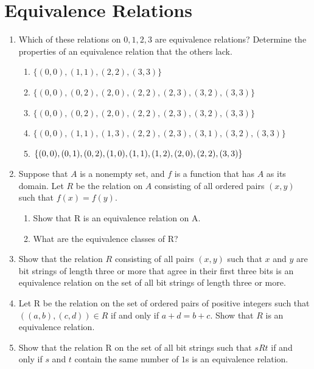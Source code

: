 \documentclass{../../cls/sig-alternate-05-2015}
\begin{document}
\section{Equivalence Relations}
\begin{enumerate}
\item Which of these relations on ${0, 1, 2, 3}$ are equivalence
relations? Determine the properties of an equivalence relation
that the others lack.
	\begin{enumerate}
		\item $\{(0, 0), (1, 1), (2, 2), (3, 3)\}$
		\item $\{(0, 0), (0, 2), (2, 0), (2, 2), (2, 3), (3, 2), (3, 3)\}$
		\item $\{(0, 0), (0, 2), (2, 0), (2, 2), (2, 3), (3, 2), (3, 3)\}$
		\item $\{(0, 0), (1, 1), (1, 3), (2, 2), (2, 3), (3, 1), (3, 2),
			(3, 3)\}$
		\item $\{(0, 0), (0, 1), (0, 2), (1, 0), (1, 1), (1, 2), (2, 0),\\
			(2, 2), (3, 3)\}$
	\end{enumerate}
	
\item Suppose that $A$ is a nonempty set, and $f$ is a function that
has $A$ as its domain. Let $R$ be the relation on $A$ consisting
of all ordered pairs $(x, y)$ such that $f (x) = f (y)$.
	\begin{enumerate}
		\item Show that R is an equivalence relation on A.
		\item What are the equivalence classes of R?
	\end{enumerate}
	
\item Show that the relation $R$ consisting of all pairs $(x, y)$ such
that $x$ and $y$ are bit strings of length three or more that
agree in their first three bits is an equivalence relation on
the set of all bit strings of length three or more.

\item Let R be the relation on the set of ordered pairs of positive
integers such that $((a, b), (c, d)) \in R $ if and only if
$a + d = b + c$. Show that $R$ is an equivalence relation.

\item Show that the relation R on the set of all bit strings such
that $s R t$ if and only if $s$ and $t$ contain the same number
of $1$s is an equivalence relation.


\end{enumerate}
\end{document}
